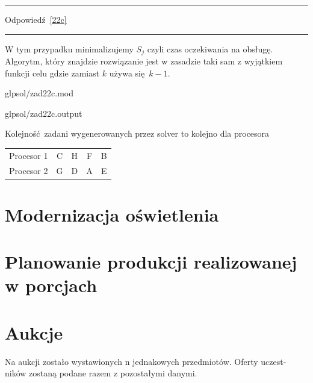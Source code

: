 \documentclass{article}
\begin{document}
\par\noindent\rule{\textwidth}{0.4pt}
Odpowiedź \ref{22c}                  
\par\noindent\rule{\textwidth}{0.4pt}

W tym przypadku minimalizujemy $S_j$ czyli czas oczekiwania na obsługę. Algorytm, który znajdzie rozwiązanie jest w zasadzie taki sam z wyjątkiem funkcji celu gdzie zamiast $k$ używa się $k - 1$.


{glpsol/zad22c.mod}


{glpsol/zad22c.output}

Kolejność zadani wygenerowanych przez solver to kolejno dla procesora

\begin{table}[H]
	\centering
	\begin{tabular}{| c | c | c | c | c |}
		Procesor 1 & C & H & F & B \\
		Procesor 2 & G & D & A & E \\
	\end{tabular}
\end{table}

\section{Modernizacja oświetlenia}

\section{Planowanie produkcji realizowanej w porcjach}

\section{Aukcje}
Na aukcji zostało wystawionych n jednakowych przedmiotów. Oferty uczest-
ników zostaną podane razem z pozostałymi danymi.
\end{document}
